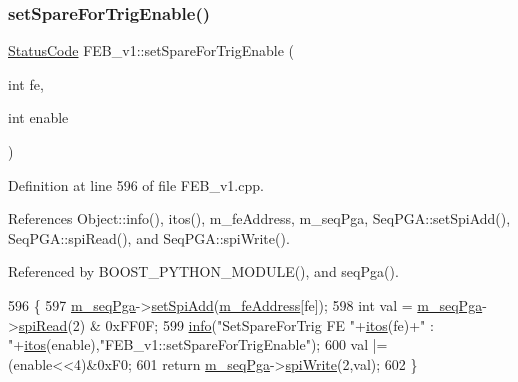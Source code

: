 \subsubsection{\texorpdfstring{set\+Spare\+For\+Trig\+Enable()}{setSpareForTrigEnable()}}
{\footnotesize\ttfamily \hyperlink{classStatusCode}{Status\+Code} F\+E\+B\+\_\+v1\+::set\+Spare\+For\+Trig\+Enable (\begin{DoxyParamCaption}\item[{int}]{fe,  }\item[{int}]{enable }\end{DoxyParamCaption})}



Definition at line 596 of file F\+E\+B\+\_\+v1.\+cpp.



References Object\+::info(), itos(), m\+\_\+fe\+Address, m\+\_\+seq\+Pga, Seq\+P\+G\+A\+::set\+Spi\+Add(), Seq\+P\+G\+A\+::spi\+Read(), and Seq\+P\+G\+A\+::spi\+Write().



Referenced by B\+O\+O\+S\+T\+\_\+\+P\+Y\+T\+H\+O\+N\+\_\+\+M\+O\+D\+U\+L\+E(), and seq\+Pga().


\begin{DoxyCode}
596                                                            \{
597   \hyperlink{classFEB__v1_a6c7804ac86796f233a8393043adf2e77}{m\_seqPga}->\hyperlink{classSeqPGA_ac998ce3a6d9b5f2e88cc8393f8c1df53}{setSpiAdd}(\hyperlink{classFEB__v1_a4e1945c2d5b434125f375e9d0fc6d99f}{m\_feAddress}[fe]);
598   \textcolor{keywordtype}{int} val = \hyperlink{classFEB__v1_a6c7804ac86796f233a8393043adf2e77}{m\_seqPga}->\hyperlink{classSeqPGA_ab3d0e5e5d4014bc7a92588a76b8713d4}{spiRead}(2) & 0xFF0F;
599   \hyperlink{classObject_a644fd329ea4cb85f54fa6846484b84a8}{info}(\textcolor{stringliteral}{"SetSpareForTrig FE "}+\hyperlink{Tools_8h_af330027dbdafb9a30768b3613c553e60}{itos}(fe)+\textcolor{stringliteral}{" : "}+\hyperlink{Tools_8h_af330027dbdafb9a30768b3613c553e60}{itos}(enable),\textcolor{stringliteral}{"FEB\_v1::setSpareForTrigEnable"});
600   val |= (enable<<4)&0xF0;
601   \textcolor{keywordflow}{return} \hyperlink{classFEB__v1_a6c7804ac86796f233a8393043adf2e77}{m\_seqPga}->\hyperlink{classSeqPGA_ad4421841ce4ce8b88ad13f63216f0743}{spiWrite}(2,val);
602 \}
\end{DoxyCode}
\mbox{\label{classFEB__v1_ab88d23abb96f746298e0fa1e1cf63e3e}} 
